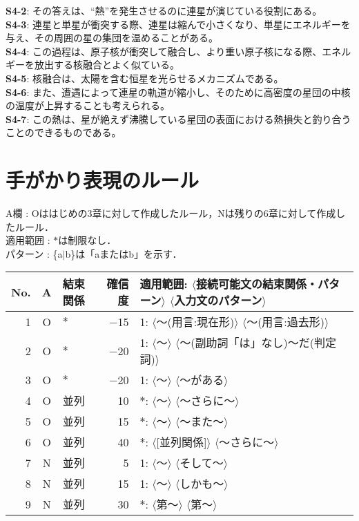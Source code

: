 {{\bf S4-2}: その答えは、“熱”を発生させるのに連星が演じている役割にある。 \\
{\bf S4-3}: 連星と単星が衝突する際、連星は縮んで小さくなり、単星にエネルギーを与え、その周囲の星の集団を温めることがある。 \\
{\bf S4-4}: この過程は、原子核が衝突して融合し、より重い原子核になる際、エネルギーを放出する核融合とよく似ている。 \\
{\bf S4-5}: 核融合は、太陽を含む恒星を光らせるメカニズムである。 \\
{\bf S4-6}: また、遭遇によって連星の軌道が縮小し、そのために高密度の星団の中核の温度が上昇することも考えられる。 \\
{\bf S4-7}: この熱は、星が絶えず沸騰している星団の表面における熱損失と釣り合うことのできるものである。 \\

\section{手がかり表現のルール}\label{sec:rule}

\noindent
A欄 : Oははじめの3章に対して作成したルール，Nは残りの6章に対して作成したルール． \\
適用範囲 : $\ast$は制限なし． \\
パターン : \{a$|$b\}は「aまたはb」を示す．

\vspace{5pt}

\noindent
\begin{tabular}{@{}r|c|lr|p{9cm}@{}} \hline \hline
No. & A & 結束関係 & 確信度 & 適用範囲: $\langle$接続可能文の結束関係・パターン$\rangle$ $\langle$入力文のパターン$\rangle$ \\ \hline
1 & O & $\ast$ & $-$15 & 1: $\langle$〜(用言:現在形)$\rangle$ $\langle$〜(用言:過去形)$\rangle$ \\
2 & O & $\ast$ & $-$20 & 1: $\langle$〜$\rangle$ $\langle$〜(副助詞「は」なし)〜だ(判定詞)$\rangle$ \\
3 & O & $\ast$ & $-$20 & 1: $\langle$〜$\rangle$ $\langle$〜がある$\rangle$ \\
4 & O & 並列 & 10 & $\ast$: $\langle$〜$\rangle$ $\langle$〜さらに〜$\rangle$ \\
5 & O & 並列 & 15 & $\ast$: $\langle$〜$\rangle$ $\langle$〜また〜$\rangle$ \\
6 & O & 並列 & 40 & $\ast$: $\langle$[並列関係]$\rangle$ $\langle$〜さらに〜$\rangle$ \\
7 & N & 並列 & 5 & 1: $\langle$〜$\rangle$ $\langle$そして〜$\rangle$ \\
8 & N & 並列 & 15 & 1: $\langle$〜$\rangle$ $\langle$しかも〜$\rangle$ \\
9 & N & 並列 & 30 & $\ast$: $\langle$第〜$\rangle$ $\langle$第〜$\rangle$ \\ \hline
\end{tabular}

}
